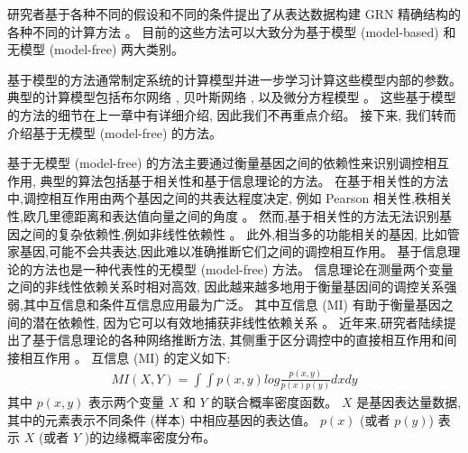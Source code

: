 
研究者基于各种不同的假设和不同的条件提出了从表达数据构建 GRN 精确结构的各种不同的计算方法 \cite{longabaugh2005computational,karlebach2008modelling}。
目前的这些方法可以大致分为基于模型 (model-based) 和无模型 (model-free) 两大类别。

基于模型的方法通常制定系统的计算模型并进一步学习计算这些模型内部的参数。
典型的计算模型包括布尔网络 \cite{shmulevich2002probabilistic,kim2007boolean,bornholdt2008boolean,zhou2016relative},
贝叶斯网络 \cite{kim2003inferring,zou2004new,chen2006effective,needham2007primer,lo2015high},
以及微分方程模型 \cite{gardner2003inferring,di2005chemogenomic,bansal2006inference, honkela2010model,lu2011high,li2011large}。
这些基于模型的方法的细节在上一章中有详细介绍, 因此我们不再重点介绍。
接下来, 我们转而介绍基于无模型 (model-free) 的方法。

基于无模型 (model-free) 的方法主要通过衡量基因之间的依赖性来识别调控相互作用,
典型的算法包括基于相关性和基于信息理论的方法。
在基于相关性的方法中,调控相互作用由两个基因之间的共表达程度决定,
例如 Pearson 相关性,秩相关性,欧几里德距离和表达值向量之间的角度 \cite{wang2014review}。
然而,基于相关性的方法无法识别基因之间的复杂依赖性,例如非线性依赖性 \cite{ruyssinck2014nimefi}。
此外,相当多的功能相关的基因, 比如管家基因,可能不会共表达,因此难以准确推断它们之间的调控相互作用。
基于信息理论的方法也是一种代表性的无模型 (model-free) 方法。
信息理论在测量两个变量之间的非线性依赖关系时相对高效, 
因此越来越多地用于衡量基因间的调控关系强弱,其中互信息和条件互信息应用最为广泛。
其中互信息 (MI) 有助于衡量基因之间的潜在依赖性,
因为它可以有效地捕获非线性依赖关系 \cite{brunel2010miss,zhang2011inferring}。
近年来,研究者陆续提出了基于信息理论的各种网络推断方法,
其侧重于区分调控中的直接相互作用和间接相互作用 \cite{marbach2010revealing}。
互信息 (MI) 的定义如下:
\begin{align} %
    MI(X,Y)=\int \int p(x,y)log \frac{p(x,y)}{p(x)p(y)}dxdy
 \end{align}
 其中 $p(x,y)$ 表示两个变量 $X$ 和 $Y$ 的联合概率密度函数。
 $X$ 是基因表达量数据,其中的元素表示不同条件 (样本) 中相应基因的表达值。
 $p(x)$ (或者 $p(y)$) 表示 $X$ (或者 $Y$ )的边缘概率密度分布。

